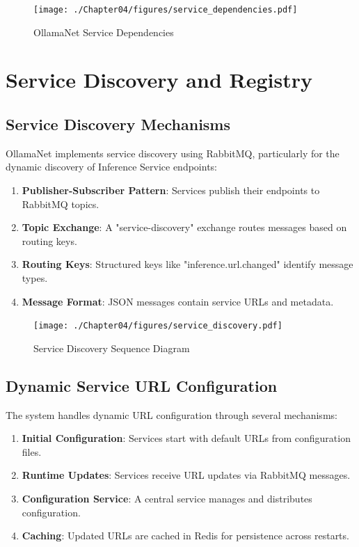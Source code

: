 \begin{figure}
    \centering
    \texttt{[image: ./Chapter04/figures/service\_dependencies.pdf]}
    \caption{OllamaNet Service Dependencies}
    \label{fig:service-dependencies}
\end{figure}
\clearpage

\section{Service Discovery and Registry}

\subsection{Service Discovery Mechanisms}

OllamaNet implements service discovery using RabbitMQ, particularly for the dynamic discovery of Inference Service endpoints:

\begin{enumerate}
   \item \textbf{Publisher-Subscriber Pattern}: Services publish their endpoints to RabbitMQ topics.
   \item \textbf{Topic Exchange}: A "service-discovery" exchange routes messages based on routing keys.
   \item \textbf{Routing Keys}: Structured keys like "inference.url.changed" identify message types.
   \item \textbf{Message Format}: JSON messages contain service URLs and metadata.
\end{enumerate}

\begin{figure}[p]
    \centering
    \texttt{[image: ./Chapter04/figures/service\_discovery.pdf]}
    \caption{Service Discovery Sequence Diagram}
    \label{fig:service-discovery}
\end{figure}
\clearpage

\subsection{Dynamic Service URL Configuration}

The system handles dynamic URL configuration through several mechanisms:

\begin{enumerate}
   \item \textbf{Initial Configuration}: Services start with default URLs from configuration files.
   \item \textbf{Runtime Updates}: Services receive URL updates via RabbitMQ messages.
   \item \textbf{Configuration Service}: A central service manages and distributes configuration.
   \item \textbf{Caching}: Updated URLs are cached in Redis for persistence across restarts.
\end{enumerate}

